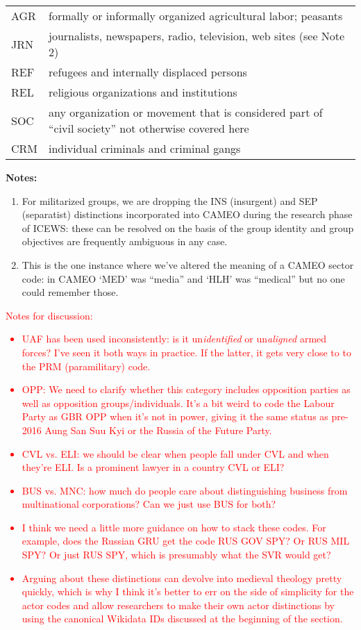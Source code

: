 \documentclass[11pt]{report}
\newcommand{\andy}[1]{\textcolor{red}{#1}}
\begin{document}
\begin{center}
\begin{longtable}{|l|p{13cm}|}
	  AGR & formally or informally organized agricultural labor; peasants \\
	  JRN & journalists, newspapers, radio, television, web sites (see Note 2)  \\ 
	  REF & refugees and internally displaced persons \\
	  REL & religious organizations and institutions \\ 
	  SOC & any organization or movement that is considered part of ``civil society''  not otherwise covered here\\
	  CRM & individual criminals and criminal gangs \\
  \hline
\end{longtable}
\noindent \raggedright{\textbf{Notes:}}
\begin{enumerate}
\item For militarized groups, we are dropping the INS (insurgent) and SEP (separatist) distinctions incorporated into CAMEO during the research phase of ICEWS: these can be resolved on the basis of the group identity and group objectives are frequently ambiguous in any case. 
\item This is the one instance where we've altered the meaning of a CAMEO sector code: in CAMEO `MED' was ``media'' and `HLH' was ``medical'' but no one could remember those.
\end{enumerate}
\end{center}

\andy{Notes for discussion:
\begin{itemize}
	\item UAF has been used inconsistently: is it un\emph{identified} or un\emph{aligned} armed forces? I've seen it both ways in practice. If the latter, it gets very close to to the PRM (paramilitary) code.
	\item OPP: We need to clarify whether this category includes opposition parties as well as opposition groups/individuals. It's a bit weird to code the Labour Party as GBR OPP when it's not in power, giving it the same status as pre-2016 Aung San Suu Kyi or the Russia of the Future Party.
	\item CVL vs. ELI: we should be clear when people fall under CVL and when they're ELI. Is a prominent lawyer in a country CVL or ELI?
	\item BUS vs. MNC: how much do people care about distinguishing business from multinational corporations? Can we just use BUS for both?
	\item I think we need a little more guidance on how to stack these codes. For example, does the Russian GRU get the code RUS GOV SPY? Or RUS MIL SPY? Or just RUS SPY, which is presumably what the SVR would get? 
	\item Arguing about these distinctions can devolve into medieval theology pretty quickly, which is why I think it's better to err on the side of simplicity for the actor codes and allow researchers to make their own actor distinctions by using the canonical Wikidata IDs discussed at the beginning of the section.
	\end{itemize}
}
\end{document}
